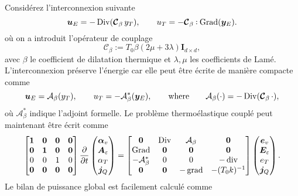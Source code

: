 Considérez l'interconnexion suivante
\begin{equation*}
\bm{u}_E = - \Div(\bm{\mathcal{C}}_\beta \, y_T), \qquad
u_T = - \bm{\mathcal{C}}_\beta \cddot\Grad(\bm{y}_E). 
\end{equation*}
où on a introduit l'opérateur de couplage
\[\bm{\mathcal{C}}_\beta:=T_0 \beta(2\mu + 3 \lambda)\bm{I}_{d\times d}, \]
avec $\beta$ le coefficient de dilatation thermique et $\lambda, \mu$ les coefficients de Lamé. L'interconnexion préserve l'énergie car elle peut être écrite de manière compacte comme
\begin{equation*}
\bm{u}_E = \mathcal{A}_\beta(y_T), \qquad u_T = - \mathcal{A}_\beta^*(\bm{y}_E), \qquad \text{where} \qquad  \mathcal{A}_\beta(\cdot) = - \operatorname*{Div}(\bm{\mathcal{C}}_\beta \, \cdot),
\end{equation*}
où $\mathcal{A}_\beta^*$ indique l'adjoint formelle. Le problème thermoélastique couplé peut maintenant être écrit comme
\begin{equation*}
\begin{bmatrix}
\bm{1} & \bm{0} & \bm{0} & \bm{0}\\
\bm{0} & \bm{1} & \bm{0} & \bm{0}\\
0 & 0 & 1 & 0\\
\bm{0} & \bm{0} & \bm{0} & \bm{0}\\
\end{bmatrix}
\diffp{}{t}
\begin{pmatrix}
\bm{\alpha}_v \\
\bm{A}_\varepsilon \\
{\alpha}_T \\
\bm{j}_Q \\
\end{pmatrix} = 
\begin{bmatrix}
\bm{0} & \Div & \mathcal{A}_\beta & \bm{0}\\
\Grad & \bm{0} & \bm{0} & \bm{0} \\
- \mathcal{A}_\beta^* & 0 & 0 & -\div \\
\bm{0} & \bm{0} & -\grad & - (T_0 k)^{-1} \\
\end{bmatrix}
\begin{pmatrix}
\bm{e}_v \\
\bm{E}_\varepsilon \\
{e}_T \\
\bm{j}_Q \\
\end{pmatrix}.
\end{equation*}
Le bilan de puissance global est facilement calculé comme
